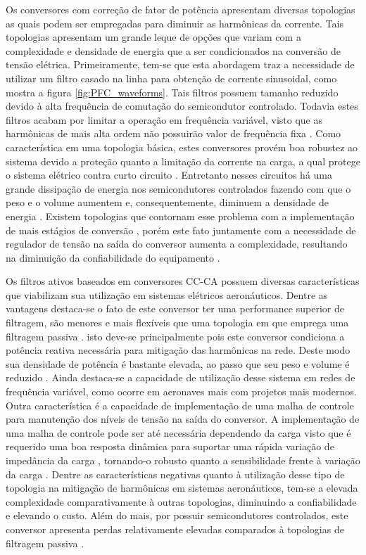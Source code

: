 Os conversores com correção de fator de potência apresentam diversas topologias as quais podem ser empregadas para diminuir as harmônicas da corrente. Tais topologias apresentam um grande leque de opções que variam com a complexidade e densidade de energia que a ser condicionados na conversão de tensão elétrica. Primeiramente, tem-se que esta abordagem traz a necessidade de utilizar um filtro casado na linha para obtenção de corrente sinusoidal, como mostra a figura \ref{fig:PFC_waveforms}. Tais filtros possuem tamanho reduzido devido à alta frequência de comutação do semicondutor controlado. Todavia estes filtros acabam por limitar a operação em frequência variável, visto que as harmônicas de mais alta ordem não possuirão valor de frequência fixa . Como característica em uma topologia básica, estes conversores provém boa robustez ao sistema devido a proteção quanto a limitação da corrente na carga, a qual protege o sistema elétrico contra curto circuito \cite{Gong2003, Lobo2005}. Entretanto nesses circuitos há uma grande dissipação de energia nos semicondutores controlados fazendo com que o peso e o volume aumentem e, consequentemente, diminuem a densidade de energia \cite{Gong2003, Lobo2005}. Existem topologias que contornam esse problema com a implementação de mais estágios de conversão \cite{Gong2003, Lobo2005}, porém este fato juntamente com a necessidade de regulador de tensão na saída do conversor aumenta a complexidade, resultando na diminuição da confiabilidade do equipamento \cite{Zhu2014}.

Os filtros ativos baseados em conversores CC-CA possuem diversas características que viabilizam sua utilização em sistemas elétricos aeronáuticos. Dentre as vantagens destaca-se o fato de este conversor ter uma performance superior de filtragem, são menores e mais flexíveis que uma topologia em que emprega uma filtragem passiva \cite{Akagi2006}.  isto deve-se principalmente pois este conversor condiciona a potência reativa necessária para mitigação das harmônicas na rede. Deste modo sua densidade de potência é bastante elevada, ao passo que seu peso e volume é reduzido \cite{Zhu2014}. Ainda destaca-se a capacidade de utilização desse sistema em redes de frequência variável, como ocorre em aeronaves mais com projetos mais modernos. Outra característica é a capacidade de implementação de uma malha de controle para manutenção dos níveis de tensão na saída do conversor. A implementação de uma malha de controle pode ser até necessária dependendo da carga visto que é requerido uma boa resposta dinâmica para suportar uma rápida variação de impedância da carga \cite{Zhu2014}, tornando-o robusto quanto a sensibilidade frente à variação da carga \cite{Chen2012}. Dentre as características negativas quanto à utilização desse tipo de topologia na mitigação de harmônicas em sistemas aeronáuticos, tem-se a elevada complexidade comparativamente à outras topologias, diminuindo a confiabilidade e elevando o custo. Além do mais, por possuir semicondutores controlados, este conversor apresenta perdas relativamente elevadas comparados à topologias de filtragem passiva \cite{Akagi2006}.

